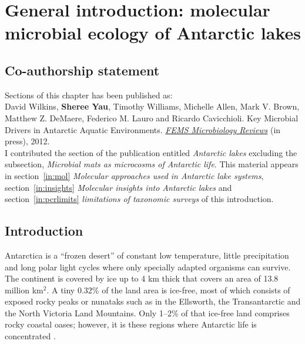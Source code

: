 \chapter[General introduction]{General introduction: molecular microbial ecology of Antarctic lakes}
\label{ch:intro}


\section*{Co-authorship statement}

Sections of this chapter has been published as:\\

David Wilkins, \textbf{Sheree Yau}, Timothy Williams, Michelle Allen, Mark V. Brown, Matthew Z. DeMaere, Federico M. Lauro and Ricardo Cavicchioli. 
Key Microbial Drivers in Antarctic Aquatic Environments. 
\textit{\underline{FEMS Microbiology Reviews}} 
(in press), 2012.\\

I contributed the section of the publication entitled \emph{Antarctic lakes} excluding the subsection, \emph{Microbial mats as microcosms of Antarctic life}.
This material appears in section~\ref{in:mol} \emph{Molecular approaches used in Antarctic lake systems}, section~\ref{in:insights} \emph{Molecular insights into Antarctic lakes} and section~\ref{in:pcrlimits} \emph{limitations of taxonomic surveys} of this introduction.
\newpage


\section{Introduction}
Antarctica is a ``frozen desert'' of constant low temperature, little precipitation and long polar light cycles where only specially adapted organisms can survive.
The continent is covered by ice up to 4 km thick that covers an area of 13.8 million km$^2$.
A tiny 0.32\% of the land area is ice-free, most of which consists of exposed rocky peaks or nunataks such as in the Ellsworth, the Transantarctic and the North Victoria Land Mountains. %
Only 1--2\% of that ice-free land comprises rocky coastal oases; however, it is these regions where Antarctic life is concentrated \cite{Hodgson2012}.

